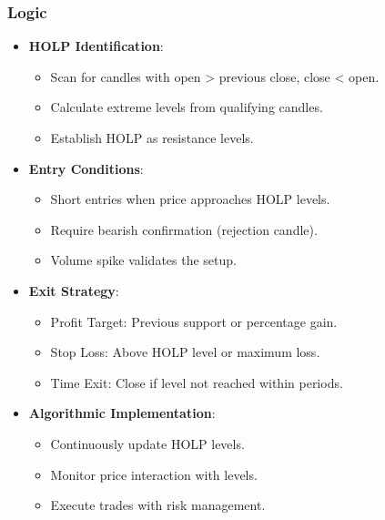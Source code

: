 \documentclass[12pt]{article}
\begin{document}
\subsubsection{Logic}
\begin{itemize}
\item \textbf{HOLP Identification}:
  \begin{itemize}
  \item Scan for candles with open > previous close, close < open.
  \item Calculate extreme levels from qualifying candles.
  \item Establish HOLP as resistance levels.
  \end{itemize}
\item \textbf{Entry Conditions}:
  \begin{itemize}
  \item Short entries when price approaches HOLP levels.
  \item Require bearish confirmation (rejection candle).
  \item Volume spike validates the setup.
  \end{itemize}
\item \textbf{Exit Strategy}:
  \begin{itemize}
  \item Profit Target: Previous support or percentage gain.
  \item Stop Loss: Above HOLP level or maximum loss.
  \item Time Exit: Close if level not reached within periods.
  \end{itemize}
\item \textbf{Algorithmic Implementation}:
  \begin{itemize}
  \item Continuously update HOLP levels.
  \item Monitor price interaction with levels.
  \item Execute trades with risk management.
  \end{itemize}
\end{itemize}
\end{document}
